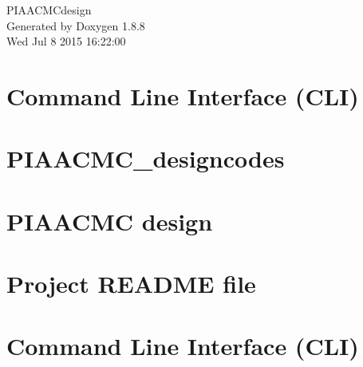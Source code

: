 \documentclass[twoside]{book}
\newcommand{\+}{\discretionary{\mbox{\scriptsize$\hookleftarrow$}}{}{}}
\newcommand{\clearemptydoublepage}{%
  \newpage{\pagestyle{empty}\cleardoublepage}%
}
\begin{document}
\hypersetup{pageanchor=false,
             bookmarks=true,
             bookmarksnumbered=true,
             pdfencoding=unicode
            }
\begin{titlepage}
\vspace*{7cm}
\begin{center}%
{\Large P\+I\+A\+A\+C\+M\+Cdesign }\\
\vspace*{1cm}
{\large Generated by Doxygen 1.8.8}\\
\vspace*{0.5cm}
{\small Wed Jul 8 2015 16:22:00}\\
\end{center}
\end{titlepage}
\clearemptydoublepage
\tableofcontents
\clearemptydoublepage
{}
\hypersetup{pageanchor=true}

\chapter{Command Line Interface (C\+L\+I)}
\label{md_PIAACMCdesign_src_CLIcore}
\hypertarget{md_PIAACMCdesign_src_CLIcore}{}

\chapter{P\+I\+A\+A\+C\+M\+C\+\_\+designcodes}
\label{md_PIAACMCdesign_src_PIAACMCsimul_PIAACMC_designcodes}
\hypertarget{md_PIAACMCdesign_src_PIAACMCsimul_PIAACMC_designcodes}{}

\chapter{P\+I\+A\+A\+C\+M\+C design}
\label{md_PIAACMCdesign_src_PIAACMCsimul_README}
\hypertarget{md_PIAACMCdesign_src_PIAACMCsimul_README}{}

\chapter{Project R\+E\+A\+D\+M\+E file}
\label{md_README}
\hypertarget{md_README}{}

\chapter{Command Line Interface (C\+L\+I)}
\label{md_src_CLIcore}
\hypertarget{md_src_CLIcore}{}

\end{document}
